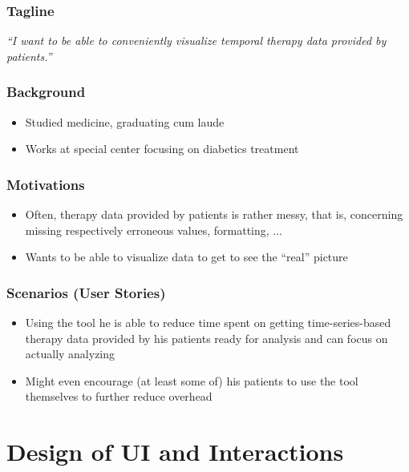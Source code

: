 \subsubsection{Tagline}

\textit{``I want to be able to conveniently visualize temporal therapy data provided by patients.''}

\subsubsection{Background}

\begin{itemize}
    \item Studied medicine, graduating cum laude
    \item Works at special center focusing on diabetics treatment
\end{itemize}

\subsubsection{Motivations}

\begin{itemize}
    \item Often, therapy data provided by patients is rather messy, that is, concerning missing respectively erroneous values, formatting, ...
    \item Wants to be able to visualize data to get to see the ``real'' picture
\end{itemize}

\subsubsection{Scenarios (User Stories)}

\begin{itemize}
    \item Using the tool he is able to reduce time spent on getting time-series-based therapy data provided by his patients ready for analysis and can focus on actually analyzing
    \item Might even encourage (at least some of) his patients to use the tool themselves to further reduce overhead
\end{itemize}


\section{Design of UI and Interactions}

